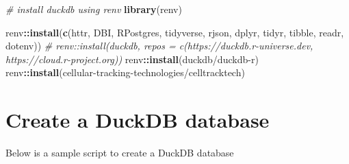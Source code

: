 \documentclass[
]{book}
\newenvironment{Shaded}{\begin{snugshade}}{\end{snugshade}}
\newcommand{\CommentTok}[1]{\textcolor[rgb]{0.56,0.35,0.01}{\textit{#1}}}
\newcommand{\FunctionTok}[1]{\textcolor[rgb]{0.13,0.29,0.53}{\textbf{#1}}}
\newcommand{\NormalTok}[1]{#1}
\newcommand{\SpecialCharTok}[1]{\textcolor[rgb]{0.81,0.36,0.00}{\textbf{#1}}}
\newcommand{\StringTok}[1]{\textcolor[rgb]{0.31,0.60,0.02}{#1}}
\begin{document}
\begin{Shaded}
\begin{Highlighting}[]
\CommentTok{\# install duckdb using renv}
\FunctionTok{library}\NormalTok{(renv)}

\NormalTok{renv}\SpecialCharTok{::}\FunctionTok{install}\NormalTok{(}\FunctionTok{c}\NormalTok{(}\StringTok{\textquotesingle{}httr\textquotesingle{}}\NormalTok{, }\StringTok{\textquotesingle{}DBI\textquotesingle{}}\NormalTok{, }\StringTok{\textquotesingle{}RPostgres\textquotesingle{}}\NormalTok{, }\StringTok{\textquotesingle{}tidyverse\textquotesingle{}}\NormalTok{, }\StringTok{\textquotesingle{}rjson\textquotesingle{}}\NormalTok{, }\StringTok{\textquotesingle{}dplyr\textquotesingle{}}\NormalTok{, }\StringTok{\textquotesingle{}tidyr\textquotesingle{}}\NormalTok{, }\StringTok{\textquotesingle{}tibble\textquotesingle{}}\NormalTok{, }\StringTok{\textquotesingle{}readr\textquotesingle{}}\NormalTok{, }\StringTok{\textquotesingle{}dotenv\textquotesingle{}}\NormalTok{))}
\CommentTok{\# renv::install(\textquotesingle{}duckdb\textquotesingle{}, repos = c(\textquotesingle{}https://duckdb.r{-}universe.dev\textquotesingle{}, \textquotesingle{}https://cloud.r{-}project.org\textquotesingle{}))}
\NormalTok{renv}\SpecialCharTok{::}\FunctionTok{install}\NormalTok{(}\StringTok{\textquotesingle{}duckdb/duckdb{-}r\textquotesingle{}}\NormalTok{)}
\NormalTok{renv}\SpecialCharTok{::}\FunctionTok{install}\NormalTok{(}\StringTok{\textquotesingle{}cellular{-}tracking{-}technologies/celltracktech\textquotesingle{}}\NormalTok{)}
\end{Highlighting}
\end{Shaded}

\section{Create a DuckDB database}\label{create-a-duckdb-database}

Below is a sample script to create a DuckDB database
\end{document}
